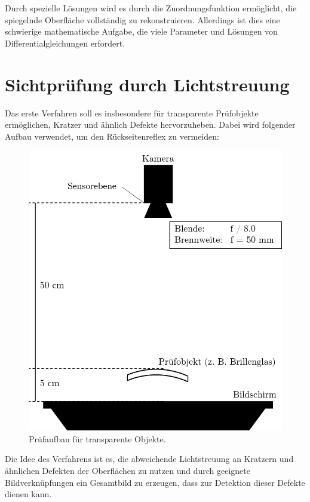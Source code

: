 \documentclass[ngerman,11pt,twocolumn,a4paper]{article}
\begin{document}
	Durch spezielle Lösungen wird es durch die Zuordnungsfunktion ermöglicht, die spiegelnde Oberfläche vollständig zu rekonstruieren.
	Allerdings ist dies eine schwierige mathematische Aufgabe, die viele Parameter und Lösungen von Differentialgleichungen erfordert.
	
	\section{Sichtprüfung durch Lichtstreuung} \label{sec:sichtpruefungDurchLichtstreuung}
	Das erste Verfahren soll es insbesondere für transparente Prüfobjekte ermöglichen, Kratzer und ähnlich Defekte hervorzuheben.
	Dabei wird folgender Aufbau verwendet, um den Rückseitenreflex zu vermeiden:
	\begin{figure}[H]
		\centering
		\includegraphics[width=0.7\columnwidth]{aufbau}
		\caption{Prüfaufbau für transparente Objekte.}
		\label{img:aufbau}
	\end{figure}
	
	Die Idee des Verfahrens ist es, die abweichende Lichtstreuung an Kratzern und ähnlichen Defekten der Oberflächen zu nutzen und durch geeignete Bildverknüpfungen ein Gesamtbild zu erzeugen, dass zur Detektion dieser Defekte dienen kann.
	
\end{document}
